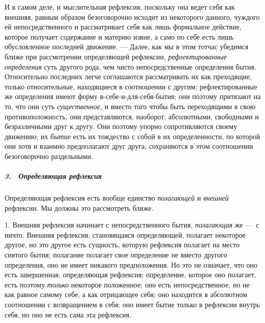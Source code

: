 И в самом деле, и мыслительная рефлексия, поскольку она ведет себя как
внешняя, равным образом безоговорочно исходит из некоторого данного,
чуждого ей непосредственного и рассматривает себя как лишь формальное
действие, которое получает содержание и материю извне, а само по себе есть
лишь обусловленное последней движение. — Далее, как мы в этом тотчас
убедимся ближе при рассмотрении определяющей рефлексии,
{\em рефлектированные определения} суть другого рода,
чем чисто непосредственные определения бытия. Относительно последних легче
соглашаются рассматривать их как преходящие, только относительные,
находящиеся в соотношении с другим; рефлектированные же определения имеют
форму в-себе-и-для-себя-бытия; они поэтому притязают на то, что они суть
{\em существенное}, и вместо того чтобы быть
переходящими в свою противоположность, они представляются, наоборот,
абсолютными, свободными и безразличными друг к другу. Они поэтому упорно
сопротивляются своему движению; их {\em бытие} есть их
тождество с собой в их определенности, по которой они хотя и взаимно
предполагают друг друга, сохраняются в этом соотношении безоговорочно
раздельными.

\subparagraph[3. \ Определяющая рефлексия]{3. \ Определяющая рефлексия}
Определяющая рефлексия есть вообще единство
{\em полагающей} и {\em внешней}
рефлексии. Мы должны это рассмотреть ближе.

1. Внешняя рефлексия начинает с непосредственного бытия,
{\em полагающая} же —~с ничто. Внешняя рефлексия,
становящаяся определяющей, полагает некоторое другое, но это другое есть
сущность, которую рефлексия полагает на место снятого бытия; полагание
полагает свое определение не вместо другого определения, оно не имеет
никакого предположения. Но это не означает, что оно есть завершенная,
определяющая рефлексия; определение, которое оно полагает, есть поэтому
{\em только} некоторое положенное; оно есть
непосредственное, но не как равное самому себе, а как отрицающее себя; оно
находится в абсолютном соотношении с возвращением в себя; оно имеет бытие
только в рефлексии внутрь себя, но оно не есть сама эта рефлексия.

